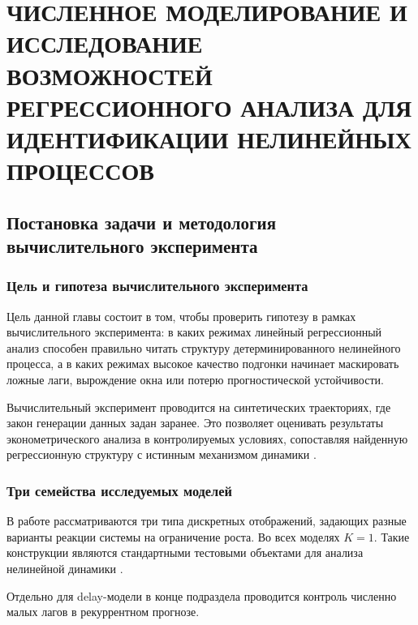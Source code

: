 \chapter{ЧИСЛЕННОЕ МОДЕЛИРОВАНИЕ И ИССЛЕДОВАНИЕ ВОЗМОЖНОСТЕЙ РЕГРЕССИОННОГО АНАЛИЗА ДЛЯ ИДЕНТИФИКАЦИИ НЕЛИНЕЙНЫХ ПРОЦЕССОВ}
\label{chap:chislennoe-modelirovanie-i-issledovanie-vozmozhnostei-regressionnogo-analiza-dlya-identifikatsii-nelineinyh-protsessov}

\section{Постановка задачи и методология вычислительного эксперимента}
\label{sec:postanovka-zadachi-i-metodologiya-vychislitelnogo-eksperimenta}

\subsection{Цель и гипотеза вычислительного эксперимента}
\label{sec:tsel-i-gipoteza-vychislitelnogo-eksperimenta}

Цель данной главы состоит в том, чтобы проверить гипотезу в рамках вычислительного эксперимента: в каких режимах линейный регрессионный анализ способен правильно читать структуру детерминированного нелинейного процесса, а в каких режимах высокое качество подгонки начинает маскировать ложные лаги, вырождение окна или потерю прогностической устойчивости.

Вычислительный эксперимент проводится на синтетических траекториях, где закон генерации данных задан заранее. Это позволяет оценивать результаты эконометрического анализа в контролируемых условиях, сопоставляя найденную регрессионную структуру с истинным механизмом динамики \cite{strogatz,montgomery,hamilton}.

\subsection{Три семейства исследуемых моделей}
\label{sec:tri-semeistva-issleduemyh-modelei}

В работе рассматриваются три типа дискретных отображений, задающих разные варианты реакции системы на ограничение роста. Во всех моделях \(K=1\). Такие конструкции являются стандартными тестовыми объектами для анализа нелинейной динамики \cite{strogatz}.

Отдельно для delay-модели в конце подраздела проводится контроль численно малых лагов в рекуррентном прогнозе.

